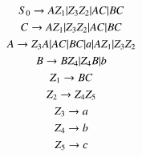 \documentclass[12pt,letterpaper]{article}
\begin{document}
		\begin{gather*}
			S_0 \rightarrow AZ_1\arrowvert Z_3 Z_2\arrowvert AC\arrowvert BC\\
			C \rightarrow AZ_1\arrowvert Z_3 Z_2\arrowvert AC\arrowvert BC\\
			A \rightarrow Z_3A\arrowvert AC\arrowvert BC\arrowvert a\arrowvert AZ_1\arrowvert Z_3 Z_2\\
			B \rightarrow BZ_4\arrowvert Z_4 B\arrowvert b\\
			Z_1 \rightarrow BC\\
			Z_2 \rightarrow Z_4 Z_5\\
			Z_3 \rightarrow a\\
			Z_4 \rightarrow b\\
			Z_5 \rightarrow c
		\end{gather*}
		
\end{document}

